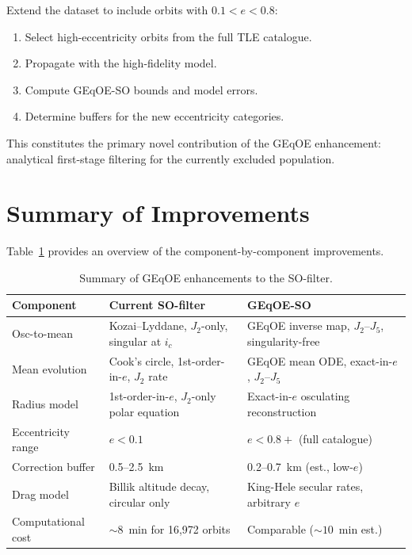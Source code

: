 \documentclass[11pt]{article}
\begin{document}
Extend the dataset to include orbits with $0.1 < e < 0.8$:
\begin{enumerate}
\item Select high-eccentricity orbits from the full TLE catalogue.
\item Propagate with the high-fidelity model.
\item Compute GEqOE-SO bounds and model errors.
\item Determine buffers for the new eccentricity categories.
\end{enumerate}

This constitutes the primary novel contribution of the GEqOE enhancement:
analytical first-stage filtering for the currently excluded population.

\section{Summary of Improvements}
\label{sec:summary}

Table~\ref{tab:summary} provides an overview of the component-by-component
improvements.

\begin{table}[h]
\centering
\caption{Summary of GEqOE enhancements to the SO-filter.}
\label{tab:summary}
\small
\begin{tabular}{p{3.2cm}p{4.5cm}p{4.5cm}}
\toprule
\textbf{Component} & \textbf{Current SO-filter} & \textbf{GEqOE-SO} \\
\midrule
Osc-to-mean &
Kozai--Lyddane, $J_2$-only, singular at $i_c$ &
GEqOE inverse map, $J_2$--$J_5$, singularity-free \\[4pt]
Mean evolution &
Cook's circle, 1st-order-in-$e$, $J_2$ rate &
GEqOE mean ODE, exact-in-$e$, $J_2$--$J_5$ \\[4pt]
Radius model &
1st-order-in-$e$, $J_2$-only polar equation &
Exact-in-$e$ osculating reconstruction \\[4pt]
Eccentricity range &
$e < 0.1$ &
$e < 0.8+$ (full catalogue) \\[4pt]
Correction buffer &
0.5--2.5~km &
0.2--0.7~km (est., low-$e$) \\[4pt]
Drag model &
Billik altitude decay, circular only &
King-Hele secular rates, arbitrary $e$ \\[4pt]
Computational cost &
$\sim\!8$~min for 16,972 orbits &
Comparable ($\sim\!10$~min est.) \\
\bottomrule
\end{tabular}
\end{table}
\end{document}
